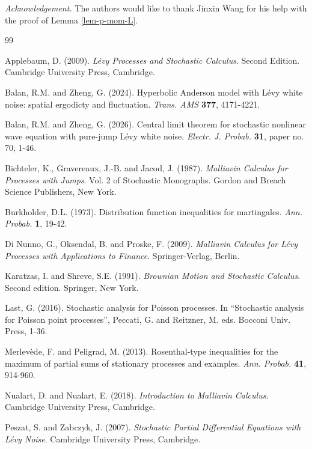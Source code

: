 \documentclass[12pt]{article}
\begin{document}
{\em Acknowledgement.} The authors would like to thank Jinxin Wang for his help with the proof of Lemma 
\ref{lem-p-mom-L}.

\begin{thebibliography}{99}

 Applebaum, D. (2009). {\em L\'evy Processes and Stochastic Calculus}. Second Edition. Cambridge University Press, Cambridge.
     
 Balan, R.M. and Zheng, G. (2024). Hyperbolic Anderson model with L\'evy white noise: spatial ergodicty and fluctuation. {\em Trans. AMS} {\bf 377}, 4171-4221.

 Balan, R.M. and Zheng, G. (2026). Central limit theorem for stochastic nonlinear wave equation with pure-jump L\'evy white noise. {\em Electr. J. Probab.}  {\bf 31}, paper no. 70, 1-46.

 Bichteler, K., Gravereaux, J.-B. and Jacod, J. (1987). {\em Malliavin Calculus for Processes with Jumps}. Vol. 2 of Stochastic Monographs. Gordon and Breach Science Publishers, New York.
    
 Burkholder, D.L. (1973). Distribution function inequalities for martingales. {\em Ann. Probab.} {\bf 1}, 19-42.    
        
 Di Nunno, G., Oksendal, B. and Proske, F. (2009). {\em Malliavin Calculus for L\'evy Processes with Applications to Finance}. Springer-Verlag, Berlin.
        
 Karatzas, I. and Shreve, S.E. (1991). {\em Brownian Motion and Stochastic Calculus}. Second edition. Springer, New York.    
    
 Last, G. (2016). Stochastic analysis for Poisson processes.
In ``Stochastic analysis for Poisson point processes'', Peccati, G. and Reitzner, M. eds. Bocconi Univ. Press, 1-36.
      
 Merlev\`ede, F. and Peligrad, M. (2013). Rosenthal-type inequalities for the maximum of partial sums of stationary processes and examples. {\em Ann. Probab.} {\bf 41}, 914-960.


 Nualart, D. and Nualart, E. (2018). {\em Introduction to Malliavin Calculus}. Cambridge University Press, Cambridge.
    

 Peszat, S. and Zabczyk, J. (2007). {\em Stochastic Partial Differential Equations with L\'evy Noise}. Cambridge University Press, Cambridge. 
     

\end{thebibliography}
\end{document}
